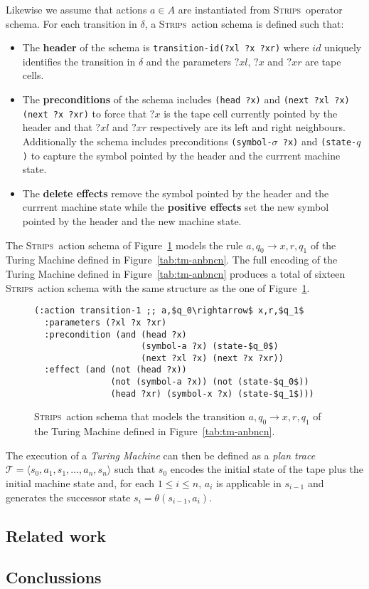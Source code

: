 \documentclass[letterpaper]{article} %
\newcommand{\tup}[1]{{\langle #1 \rangle}}
\newcommand{\strips}{\textsc{Strips}}     %
\begin{document}
Likewise we assume that actions $a\in A$ are instantiated from \strips\ operator schema. For each transition in $\delta$, a \strips\ action schema is defined such that:
\begin{itemize}
\item The {\bf header} of the schema is {\tt transition-id(?xl ?x ?xr)} where $id$ uniquely identifies the transition in $\delta$ and the parameters $?xl$, $?x$ and $?xr$ are tape cells.
\item The {\bf preconditions} of the schema includes {\tt(head ?x)} and {\tt (next ?xl ?x) (next ?x ?xr)} to force that $?x$ is the tape cell currently pointed by the header and that $?xl$ and $?xr$ respectively are its left and right neighbours. Additionally the schema includes preconditions {\tt(symbol-$\sigma$ ?x)} and {\tt (state-$q$)} to capture the symbol pointed by the header and the currrent machine state.
\item The {\bf delete effects} remove the symbol pointed by the header and the currrent machine state while the {\bf positive effects} set the new symbol pointed by the header and the new machine state.
\end{itemize}

The \strips\ action schema of Figure~\ref{fig:update-rule} models the rule $a,q_0\rightarrow x,r,q_1$ of the Turing Machine defined in Figure~\ref{tab:tm-anbncn}. The full encoding of the Turing Machine defined in Figure~\ref{tab:tm-anbncn} produces a total of sixteen \strips\ action schema with the same structure as the one of Figure~\ref{fig:update-rule}. 
\begin{figure}[hbt!]
\begin{scriptsize}
\begin{lstlisting}
(:action transition-1 ;; a,$q_0\rightarrow$ x,r,$q_1$
  :parameters (?xl ?x ?xr)
  :precondition (and (head ?x)                       
                     (symbol-a ?x) (state-$q_0$)
                     (next ?xl ?x) (next ?x ?xr))
  :effect (and (not (head ?x)) 
               (not (symbol-a ?x)) (not (state-$q_0$))
               (head ?xr) (symbol-x ?x) (state-$q_1$)))
\end{lstlisting}
\end{scriptsize}
 \caption{\small \strips\ action schema that models the transition $a,q_0\rightarrow x,r,q_1$ of the Turing Machine defined in Figure~\ref{tab:tm-anbncn}.}
\label{fig:update-rule}
\end{figure}

The execution of a {\em Turing Machine} can then be defined as a {\em plan trace} $\mathcal{T}=\tup{s_0,a_1,s_1,\ldots,a_n,s_n}$ such that $s_0$ encodes the initial state of the tape plus the initial machine state and, for each {\small $1\leq i\leq n$}, $a_i$ is applicable in $s_{i-1}$ and generates the successor state $s_i=\theta(s_{i-1},a_i)$. 

\subsection{Related work}
\label{sec:section6}

\subsection{Conclussions}
\label{sec:section7}



\end{document}
